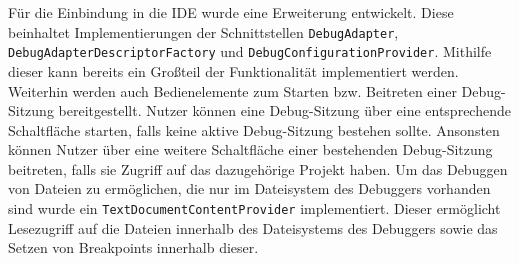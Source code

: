 Für die Einbindung in die IDE wurde eine Erweiterung entwickelt. Diese beinhaltet Implementierungen der Schnittstellen \texttt{DebugAdapter}, \texttt{DebugAdapterDescriptorFactory} und \texttt{DebugConfigurationProvider}. Mithilfe dieser kann bereits ein Großteil der Funktionalität implementiert werden. Weiterhin werden auch Bedienelemente zum Starten bzw. Beitreten einer Debug-Sitzung bereitgestellt. Nutzer können eine Debug-Sitzung über eine entsprechende Schaltfläche starten, falls keine aktive Debug-Sitzung bestehen sollte. Ansonsten können Nutzer über eine weitere Schaltfläche einer bestehenden Debug-Sitzung beitreten, falls sie Zugriff auf das dazugehörige Projekt haben. Um das Debuggen von Dateien zu ermöglichen, die nur im Dateisystem des Debuggers vorhanden sind wurde ein \texttt{TextDocumentContentProvider} implementiert. Dieser ermöglicht Lesezugriff auf die Dateien innerhalb des Dateisystems des Debuggers sowie das Setzen von Breakpoints innerhalb dieser.